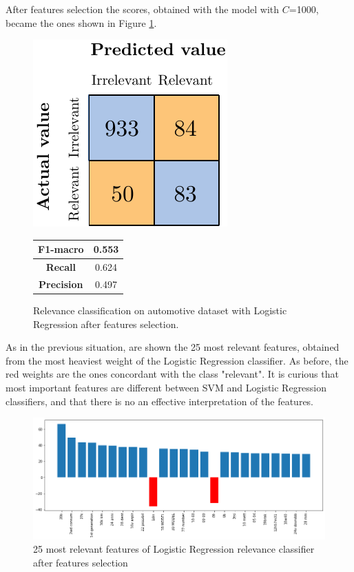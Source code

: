 After features selection the scores, obtained with the model with $C$=1000, became the ones shown in Figure \ref{fig:ita_rel_logreg_afs}.


\begin{figure}[H]
	\begin{minipage}[b]{0.6\linewidth}
		\centering
		\includegraphics[scale=1]{figures/conf_matrices/ita_rel_logreg/ita_rel_logreg_afs.pdf}
	\end{minipage}
	\begin{minipage}[b]{0.3\linewidth}
		\begin{tabular}[b]{ | c | c | } 
			\hline
			\textbf{F1-macro} & 0.553 \\
			\hline
			\textbf{Recall} & 0.624 \\ 
			\hline
			\textbf{Precision} & 0.497 \\ 
			\hline
		\end{tabular}
	\end{minipage}
	\caption{Relevance classification on automotive dataset with Logistic Regression after features selection.}
	\label{fig:ita_rel_logreg_afs}
\end{figure}

As in the previous situation, are shown the 25 most relevant features, obtained from the most heaviest weight of the Logistic Regression classifier. As before, the red weights are the ones concordant with the class "relevant". It is curious that most important features are different between SVM and Logistic Regression classifiers, and that there is no an effective interpretation of the features.

\begin{figure}[H]
	\centering
	\includegraphics[width=\textwidth]{figures/conf_matrices/ita_rel_logreg/logreg_rel_best_feat.png}
	\caption{25 most relevant features of Logistic Regression relevance classifier after features selection}
	\label{fig:ita_rel_logreg_feat}
\end{figure}

